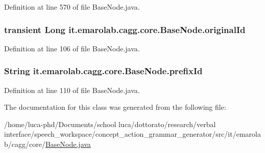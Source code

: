 Definition at line 570 of file Base\-Node.\-java.

\hypertarget{classit_1_1emarolab_1_1cagg_1_1core_1_1BaseNode_a6a3d93e1d8a6fa71aeded8749347da7c}{
\subsubsection[{original\-Id}]{\setlength{\rightskip}{0pt plus 5cm}transient Long it.\-emarolab.\-cagg.\-core.\-Base\-Node.\-original\-Id\hspace{0.3cm}{\ttfamily [private]}}}\label{classit_1_1emarolab_1_1cagg_1_1core_1_1BaseNode_a6a3d93e1d8a6fa71aeded8749347da7c}


Definition at line 106 of file Base\-Node.\-java.

\hypertarget{classit_1_1emarolab_1_1cagg_1_1core_1_1BaseNode_a1e4662066a1e580f3ef9a1ad7c483dd8}{
\subsubsection[{prefix\-Id}]{\setlength{\rightskip}{0pt plus 5cm}String it.\-emarolab.\-cagg.\-core.\-Base\-Node.\-prefix\-Id\hspace{0.3cm}{\ttfamily [private]}}}\label{classit_1_1emarolab_1_1cagg_1_1core_1_1BaseNode_a1e4662066a1e580f3ef9a1ad7c483dd8}


Definition at line 110 of file Base\-Node.\-java.



The documentation for this class was generated from the following file\-:\begin{DoxyCompactItemize}
\item 
/home/luca-\/phd/\-Documents/school luca/dottorato/research/verbal interface/speech\-\_\-workspace/concept\-\_\-action\-\_\-grammar\-\_\-generator/src/it/emarolab/cagg/core/\hyperlink{BaseNode_8java}{Base\-Node.\-java}\end{DoxyCompactItemize}
